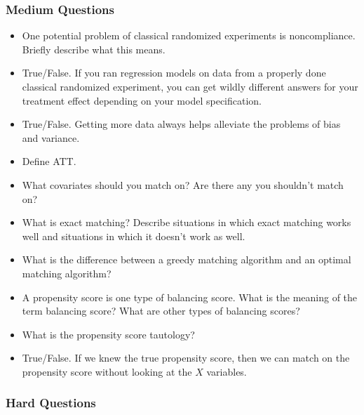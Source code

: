 \documentclass[11pt]{article}
\begin{document}
\subsubsection{Medium Questions}

\begin{itemize}
\item One potential problem of classical randomized experiments is noncompliance.  Briefly describe what this means.

\item True/False.  If you ran regression models on data from a properly done classical randomized experiment, you can get wildly different answers for your treatment effect depending on your model specification.

\item True/False.  Getting more data always helps alleviate the problems of bias and variance.

\item Define ATT.

\item What covariates should you match on?  Are there any you shouldn't match on?

\item What is exact matching?  Describe situations in which exact matching works well and situations in which it doesn't work as well.

\item What is the difference between a greedy matching algorithm and an optimal matching algorithm?

\item A propensity score is one type of balancing score.  What is the meaning of the term balancing score?  What are other types of balancing scores?

\item What is the propensity score tautology?

\item True/False.  If we knew the true propensity score, then we can match on the propensity score without looking at the $X$ variables.

\end{itemize}

\subsubsection{Hard Questions}
\end{document}
